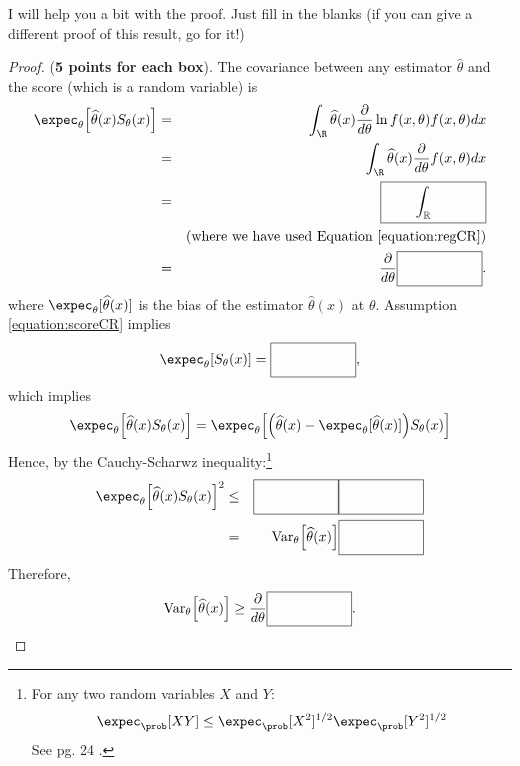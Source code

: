 \documentclass[11pt]{article} %
\begin{document}
\noindent I will help you a bit with the proof. Just fill in the blanks (if you can give a different proof of this result, go for it!)

\begin{proof}
\noindent  (\textbf{5 points for each box}). The covariance between any estimator $\widehat{\theta}$ and the score (which is a random variable) is
\begin{eqnarray*}
\expec_{\theta} \Big[ \widehat{\theta}(x) S_{\theta}(x) \Big] &=&  \int_{\R} \widehat{\theta}(x) \frac{\partial}{d\theta} \ln f(x,\theta) f(x,\theta) dx \\
&=& \int_{\R} \widehat{\theta}(x) \frac{\partial}{d\theta} f(x,\theta) dx \\
&=& \boxed{\quad \quad \Big. \int_{\mathbb{R}} \Big.  \hspace{.5cm} \quad \quad } \\
&& (\text{where we have used Equation \ref{equation:regCR}}) \\
&=& \frac{\partial}{d\theta} \boxed{\quad \quad \Big. \Big.  \hspace{.5cm} \quad \quad }.
\end{eqnarray*}
\noindent where $\expec_{\theta}[\widehat{\theta}(x)]$ is the bias of the estimator $\widehat{\theta}(x)$ at $\theta$. Assumption \ref{equation:scoreCR} implies 
$$\expec_{\theta}[S_{\theta}(x)]= \boxed{\quad \quad \Big. \Big.  \hspace{.5cm} \quad \quad } \\ ,$$
\noindent which implies
$$\expec_{\theta} \Big[ \widehat{\theta}(x) S_{\theta}(x) \Big] = \expec_{\theta} \Big[ \Big(\widehat{\theta}(x)-\expec_{\theta}[\widehat{\theta}(x)] \Big)S_{\theta}(x) \Big]$$
\noindent Hence, by the Cauchy-Scharwz inequality:\footnote{For any two random variables $X$ and $Y$:
\begin{equation*}
\expec_{\prob}[XY] \leq \expec_{\prob}[X^2]^{1/2} \expec_{\prob}[Y^2]^{1/2}
\end{equation*}
See pg. 24 \cite{durrett2010}. 
}
\begin{eqnarray*}
\expec_{\theta} \Big[ \widehat{\theta}(x) S_{\theta}(x) \Big]^2 &\leq&  \boxed{\quad \quad \Big. \Big.  \hspace{.5cm} \quad \quad }  \boxed{\quad \quad \Big. \Big.  \hspace{.5cm} \quad \quad } \\
&=& \text{Var}_{\theta} \Big[ \widehat{\theta}(x) \Big] \boxed{\quad \quad \Big. \Big.  \hspace{.5cm} \quad \quad }
\end{eqnarray*}
\noindent Therefore,
$$\text{Var}_{\theta}\Big[ \widehat{\theta}(x)\Big] \geq  \frac{\partial}{d\theta} \boxed{\quad \quad \Big. \Big.  \hspace{.5cm} \quad \quad }.$$
\end{proof}
\end{document}
